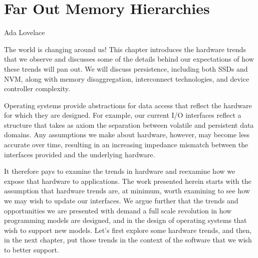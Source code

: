 \chapter{Far Out Memory Hierarchies}\label{ch:farout}

{Ada Lovelace}

\begin{chabstract}
    The world is changing around us!
    This chapter introduces the hardware trends that we observe and discusses some of the details behind our expectations of how these trends will pan out. We will discuss persistence,
    including both SSDs and NVM, along with memory disaggregation, interconnect technologies, and device controller complexity.
\end{chabstract}

Operating systems provide abstractions for data access that reflect the hardware for which they are designed. For example, our current I/O interfaces reflect a structure that takes as axiom
the separation between volatile and persistent data domains. Any assumptions we make about hardware, however, may become less accurate over time, resulting in an increasing impedance mismatch
between the interfaces provided and the underlying hardware.



It therefore pays to examine the trends in hardware and reexamine how we expose that hardware to applications. The work presented
herein starts with the assumption that hardware trends are, at minimum, worth examining to see how we may wish to update our interfaces. We argue further that the trends and
opportunities we are presented with demand a full scale revolution in how programming models are designed, and in the design of operating systems that wish to support new models. Let's
first explore some hardware trends, and then, in the next chapter, put those trends in the context of the software that we wish to better support.


